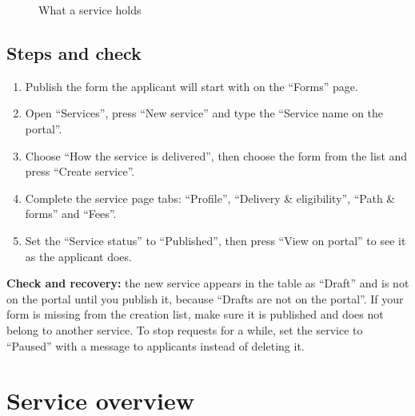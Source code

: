 \begin{figure}[H]
\centering
{}
\rclegend
\caption{What a service holds}
\label{fig:builder-services-model}
\end{figure}

\subsection{Steps and check}
\begin{enumerate}
\item Publish the form the applicant will start with on the “Forms” page.
\item Open “Services”, press “New service” and type the “Service name on the portal”.
\item Choose “How the service is delivered”, then choose the form from the list and press “Create service”.
\item Complete the service page tabs: “Profile”, “Delivery \& eligibility”, “Path \& forms” and “Fees”.
\item Set the “Service status” to “Published”, then press “View on portal” to see it as the applicant does.
\end{enumerate}

\textbf{Check and recovery:} the new service appears in the table as “Draft” and is not on the portal until you publish it, because “Drafts are not on the portal”. If your form is missing from the creation list, make sure it is published and does not belong to another service. To stop requests for a while, set the service to “Paused” with a message to applicants instead of deleting it.

\clearpage
\section{Service overview}
\label{sec:builder-feature-services-overview}


